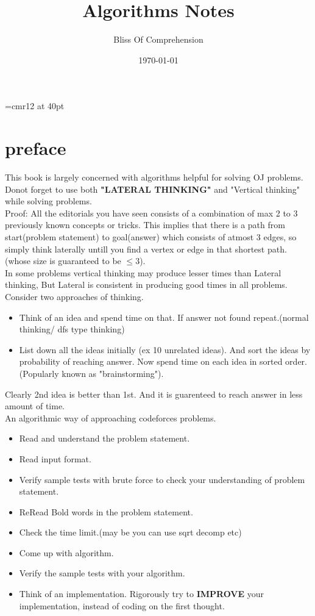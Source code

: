 \documentclass[a4paper,12pt]{report}
\begin{document}
\font\TitleF=cmr12 at 40pt
\title{\TitleF Algorithms Notes}
\author{Bliss Of Comprehension}
\date{\today}
\maketitle

\tableofcontents

\chapter*{preface}

This book is largely concerned with algorithms helpful for solving OJ problems.\\

Donot forget to use both \textbf{"LATERAL THINKING"} and "Vertical thinking" while solving problems.\\
Proof: All the editorials you have seen consists of a combination of max  2 to 3 previously known concepts or tricks. This implies that there is a path from start(problem statement) to goal(answer) which consists of atmost 3 edges, so simply think laterally untill you find a vertex or edge in that shortest path. (whose size is guaranteed to be $\leq 3$).\\ 

In some problems vertical thinking may produce lesser times than Lateral thinking, But Lateral is consistent in producing good times in all problems.\\

Consider two approaches of thinking.
\begin{itemize}
	\item Think of an idea and spend time on that. If answer not found 
	repeat.(normal thinking/ dfs type thinking)
	\item List down all the ideas initially (ex 10 unrelated ideas). And sort the ideas by probability of reaching answer. Now spend time on each idea in sorted order.(Popularly known as "brainstorming").
\end{itemize}
Clearly 2nd idea is better than 1st. And it is guarenteed to reach answer in less amount of time.\\

An algorithmic way of approaching codeforces problems.
\begin{itemize}
	\item Read and understand the problem statement.
	\item Read input format.
	\item Verify sample tests with brute force to check your understanding of problem statement.
	\item ReRead Bold words in the problem statement.
	\item Check the time limit.(may be you can use sqrt decomp etc)
	\item Come up with algorithm.
	\item Verify the sample tests with your algorithm.
	\item Think of an implementation. Rigorously try to \textbf{IMPROVE} your implementation, instead of coding on the first thought. 
\end{itemize}
\end{document}
